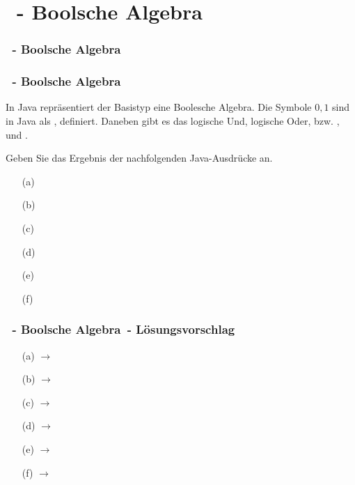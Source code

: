 \def\stitle{\theexercise\ - Boolsche Algebra}
\section{\stitle}
\begin{frame}
    \frametitle{\stitle}%
\tableofcontents[current]
\end{frame}

\begin{frame}[t]
  \frametitle{\stitle}

In Java repräsentiert der Basistyp  eine Boolesche Algebra.
Die Symbole $0, 1$ sind in Java als ,  definiert.
Daneben gibt es das logische Und, logische Oder, bzw. \code{\&\&}, \code{||} und \code{!}.

Geben Sie das Ergebnis der nachfolgenden Java-Ausdrücke an.
\medskip

\begin{minipage}{0.49\textwidth}
\begin{itemize}
\item[(a)] 
\item[(b)] 
\item[(c)] 
\end{itemize}
\end{minipage}
\begin{minipage}{0.49\textwidth}
\begin{itemize}
\item[(d)] 
\item[(e)] 
\item[(f)] 
\end{itemize}
\end{minipage}
\end{frame}

\begin{frame}[t]
  \frametitle{\stitle\ - L\"osungsvorschlag}
\begin{center}
\begin{minipage}{0.49\textwidth}
\begin{itemize}
\item[(a)]       $\rightarrow$ 
\item[(b)]       $\rightarrow$ 
\item[(c)] $\rightarrow$ 
\end{itemize}
\end{minipage}
\begin{minipage}{0.49\textwidth}
\begin{itemize}
\item[(d)] $\rightarrow$ 
\item[(e)]              $\rightarrow$ 
\item[(f)]    $\rightarrow$ 
\end{itemize}
\end{minipage}
\end{center}

\end{frame}
